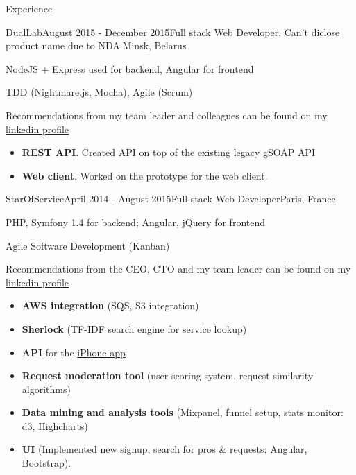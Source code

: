 \documentclass{resume} %
\begin{document}
\begin{rSection}{Experience}

\begin{rSubsection}{DualLab}{August 2015 - December 2015}{Full stack Web Developer. Can't diclose product name due to NDA.}{Minsk, Belarus}
\item NodeJS + Express used for backend, Angular for frontend 
\item TDD (Nightmare.js, Mocha), Agile (Scrum)
\item Recommendations from my team leader and colleagues can be found on my \href{http://linkedin.com/in/mikhalchenkoa}{linkedin profile}


\begin{itemize}[leftmargin=*,label={$+$}]
  \item {\bf REST API}.  Created API on top of the existing legacy gSOAP API
  \item {\bf Web client}. Worked on the prototype for the web client.
\end{itemize}

\end{rSubsection}


\begin{rSubsection}{StarOfService}{April 2014 - August 2015}{Full stack Web Developer}{Paris, France}
\item PHP, Symfony 1.4 for backend; Angular, jQuery for frontend
\item Agile Software Development (Kanban)
\item Recommendations from the CEO, CTO and my team leader can be found on my \href{http://linkedin.com/in/mikhalchenkoa}{linkedin profile}


\begin{itemize}[leftmargin=*,label={$+$}]
  \item {\bf AWS integration} (SQS, S3 integration)
  \item {\bf Sherlock} (TF-IDF search engine for service lookup)
  \item {\bf API} for the \href{https://itunes.apple.com/fr/app/starofservice/id948344674?mt=8}{iPhone app}
  \item {\bf Request moderation tool} (user scoring system, request similarity algorithms)
  \item {\bf Data mining and analysis tools} (Mixpanel, funnel setup, stats monitor: d3, Highcharts)
  \item {\bf UI} (Implemented new signup, search for pros \& requests: Angular, Bootstrap).
\end{itemize}


\end{rSubsection}
\end{rSection}
\end{document}
